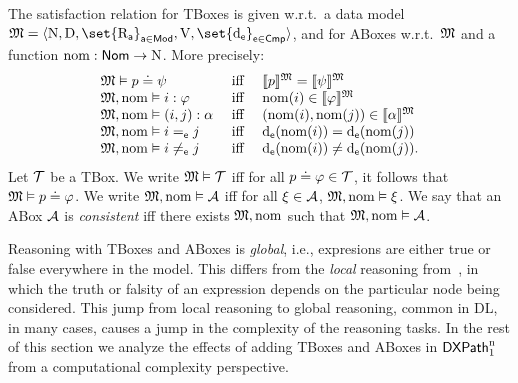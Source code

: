 \begin{definition}\label{def:xp-kb-semantics}
    The satisfaction relation for TBoxes is given w.r.t.\ a data model ${\model= \tup{ \N, \D, \set{\R_{\apath}}_{\apath \in \mods}, \valuation,\set{\data_\cmp}_{\cmp \in \cmps} }}$, and for ABoxes w.r.t.\ $\mathfrak{M}$ and a function ${\operatorname{nom} : \mathsf{Nom} \to \mathrm{N}}$.
    More precisely:
    \[
        \begin{array}{l c l}
            \mathfrak{M} \vDash p \doteq \psi & \text{ iff } & \llbracket{p}\rrbracket^{\mathfrak{M}} = \llbracket{\psi}\rrbracket^{\mathfrak{M}} \\ 
            \mathfrak{M},\operatorname{nom} \vDash i:\varphi & \text{ iff } & \operatorname{nom}(i) \in \llbracket{\varphi}\rrbracket^{\mathfrak{M}} \\
            \mathfrak{M},\operatorname{nom} \vDash (i,j):\alpha  & \text{ iff } &  (\operatorname{nom}(i),\operatorname{nom}(j)) \in \llbracket{\alpha}\rrbracket^{\mathfrak{M}} \\ 
            \mathfrak{M},\operatorname{nom} \vDash i=_{\mathsf{e}} j & \text{ iff } & \operatorname{d}_{\mathsf{e}}(\operatorname{nom}(i)) = \operatorname{d}_{\mathsf{e}}(\operatorname{nom}(j)) \\
            \mathfrak{M},\operatorname{nom} \vDash i\neq_{\mathsf{e}} j & \text{ iff } & \operatorname{d}_{\mathsf{e}}(\operatorname{nom}(i)) \neq \operatorname{d}_{\mathsf{e}}(\operatorname{nom}(j)).
        \end{array}
    \]
    Let $\mathcal{T}$ be a TBox.
    We write $\mathfrak{M} \vDash \mathcal{T}$ iff for all ${p \doteq \varphi} \in \mathcal{T}$, it follows that $\mathfrak{M} \vDash {p \doteq \varphi}$.
    We write $\mathfrak{M}, \operatorname{nom} \vDash \mathcal{A}$ iff for all $\xi \in \mathcal{A}$, ${\mathfrak{M}, \operatorname{nom} \vDash \xi}$.
    We say that an ABox $\mathcal{A}$ is \emph{consistent} iff there exists $\mathfrak{M},\operatorname{nom}$ such that  $\mathfrak{M},\operatorname{nom} \vDash \mathcal{A}$.
\end{definition}

Reasoning with TBoxes and ABoxes is \emph{global}, i.e., expresions are either true or false everywhere in the model.
This differs from the \emph{local} reasoning from~, in which the truth or falsity of an expression depends on the particular node being considered. This jump from local reasoning to global reasoning, common in DL, in many cases, causes  a jump in the complexity of the reasoning tasks. In the rest of this section we analyze the effects of adding TBoxes and ABoxes in $\mathsf{DXPath}_{\rm 1}^{\rm n}$ from a computational complexity perspective.

